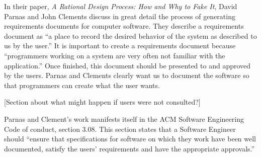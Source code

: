 \documentclass[11pt]{article}
\begin{document}
\author{Mark Gius \\
        Section 03}
\date{\today}
\title{}

\maketitle

\newpage

In their paper, \emph{A Rational Design Process: How and Why to Fake It}, David Parnas and John Clements discuss in great detail the process of generating requirements documents for computer software.  They describe a requirements document as ``a place to record the desired behavior of the system as described to us by the user.''  It is important to create a requirements document because ``programmers working on a system are very often not familiar with the application.''  Once finished, this document should be presented to and approved by the users.  Parnas and Clements clearly want us to document the software so that programmers can create what the user wants.

[Section about what might happen if users were not consulted?]

Parnas and Clement's work manifests itself in the ACM Software Engineering Code of conduct, section 3.08.  This section states that a Software Engineer should ``ensure that specifications for software on which they work have been well documented, satisfy the users’ requirements and have the appropriate approvals.''

\newpage

\nocite{*}




\end{document}

